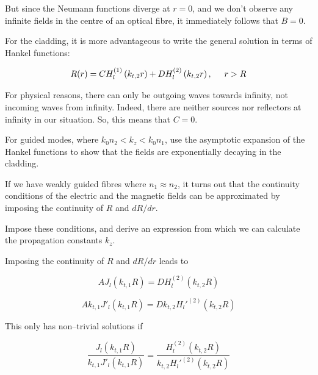 But since the Neumann functions diverge at $r=0$, and we don't observe any infinite fields in the centre of an optical fibre, it immediately follows that $B=0$.

For the cladding, it is more advantageous to write the general solution in terms of Hankel functions:

\begin{equation}
R(r) = C H_l^{(1)}\left(k_{t,2}r\right) + D H_l^{(2)}\left(k_{t,2}r\right), \hspace{0.5 cm} r>R \label{eq-fibre-2}
\end{equation} 

For physical reasons, there can only be outgoing waves towards infinity, not incoming waves from infinity. Indeed, there are neither sources nor reflectors at infinity in our situation. So, this means that $C=0$.

\begin{exer}
For guided modes, where $k_0 n_2 < k_z < k_0 n_1$, use the asymptotic expansion of the Hankel functions to show that the fields are exponentially decaying in the cladding.
\end{exer}

If we have weakly guided fibres where $n_1 \approx n_2$, it turns out that the continuity conditions of the electric and the magnetic fields can be approximated by imposing the continuity of $R$ and $d R / d r$.

\begin{cue}
Impose these conditions, and derive an expression from which we can calculate the propagation constants $k_z$. 
\end{cue}

Imposing the continuity of $R$ and $d R / dr$ leads to

\begin{equation}
A J_l\left(k_{t,1}R\right) = D H_l^{(2)}\left(k_{t,2}R\right)
\end{equation} 

\begin{equation}
A k_{t,1} J'_l\left(k_{t,1}R\right) = D k_{t,2} H_l'^{(2)}\left(k_{t,2}R\right)
\end{equation} 

This only has non--trivial solutions if

\begin{equation}
\frac{J_l\left(k_{t,1}R\right)}{k_{t,1} J'_l\left(k_{t,1}R\right)} = \frac{H_l^{(2)}\left(k_{t,2}R\right)}{k_{t,2} H_l'^{(2)}\left(k_{t,2}R\right)} \label{eq-disp-fibre}
\end{equation}

